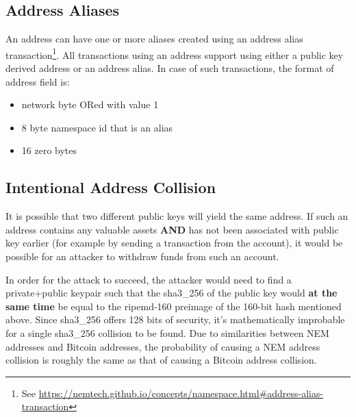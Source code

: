 \begin{figure}
\end{figure}

\pagebreak

\subsection{Address Aliases}
An address can have one or more aliases created using an address alias transaction\footnote{
See \url{https://nemtech.github.io/concepts/namespace.html\#address-alias-transaction}}.
All transactions using an address support using either a public key derived address or an address alias.
In case of such transactions, the format of address field is:
\begin{itemize}
	\item{network byte ORed with value 1}
	\item{8 byte namespace id that is an alias}
	\item{16 zero bytes}
\end{itemize}

\subsection{Intentional Address Collision}
It is possible that two different public keys will yield the same address.
If such an address contains any valuable assets \textbf{AND} has not been associated with public key earlier (for example by sending a transaction from the account), it would be possible for an attacker to withdraw funds from such an account.

In order for the attack to succeed, the attacker would need to find a private+public keypair such that the sha3\_256 of the public key would \textbf{at the same time} be equal to the ripemd-160 preimage of the 160-bit hash mentioned above.
Since sha3\_256 offers 128 bits of security, it's mathematically improbable for a single sha3\_256 collision to be found.
Due to similarities between NEM addresses and Bitcoin addresses, the probability of causing a NEM address collision is roughly the same as that of causing a Bitcoin address collision.
